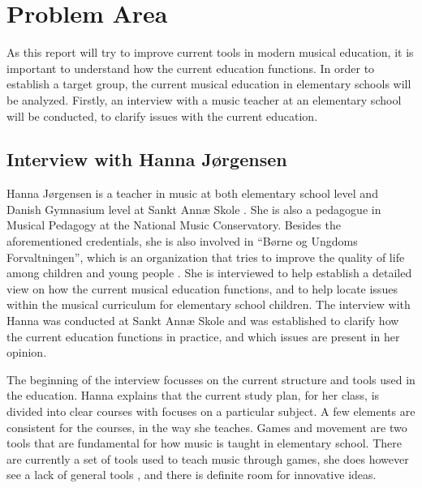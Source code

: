 \section{Problem Area}
As this report will try to improve current tools in modern musical education, it is important to understand how the current education functions. In order to establish a target group, the current musical education in elementary schools will be analyzed. Firstly, an interview with a music teacher at an elementary school will be conducted, to clarify  issues with the current education. \\	



\subsection{Interview with Hanna Jørgensen} 
Hanna Jørgensen is a teacher in music at both elementary school level and Danish Gymnasium level at Sankt Annæ Skole . She is also a pedagogue in Musical Pedagogy at the National Music Conservatory. Besides the aforementioned credentials, she is also involved in “Børne og Ungdoms Forvaltningen”, which is an organization that tries to improve the quality of life among children and young people . She is interviewed to help establish a detailed view on how the current musical education functions, and to help locate issues within the musical curriculum for elementary school children.
The interview with Hanna was conducted at Sankt Annæ Skole and was established to clarify how the current education functions in practice, and which issues are present in her opinion.\\ 

The beginning of the interview focusses on the current structure and tools used in the education. Hanna explains that the current study plan, for her class, is divided into clear courses with focuses on a particular subject. A few elements are consistent for the courses, in the way she teaches. Games and movement are two tools that are fundamental for how music is taught in elementary school. There are currently a set of tools used to teach music through games, she does however see a lack of general tools , and there is definite room for innovative ideas.\\

